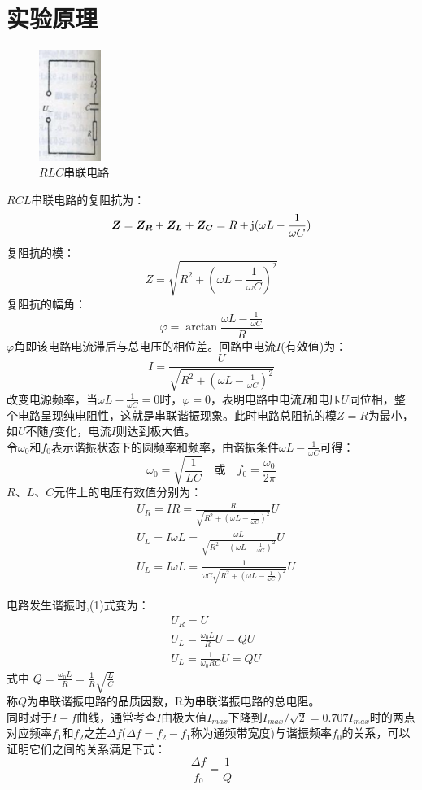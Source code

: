 \documentclass{article}
\begin{document}
\section{实验原理}
\begin{figure}[!h]
    \centering
    \includegraphics[width=2cm]{3.png}
    \caption{$RLC$串联电路}
    \end{figure}
\hspace*{2em}$RCL$串联电路的复阻抗为：
$$
\bm{Z}=\bm{Z_R}+\bm{Z_L}+\bm{Z_C} =R+\textup{j}(\omega L-\frac{1}{\omega C})
$$
复阻抗的模：
$$
Z=\sqrt{R^2+(\omega L-\frac{1}{\omega C})^2}
$$
复阻抗的幅角：
$$
\varphi=\arctan\frac{\omega L-\frac{1}{\omega C}}{R}
$$
$\varphi$角即该电路电流滞后与总电压的相位差。回路中电流$I$(有效值)为：
$$
I=\frac{U}{\sqrt{R^2+(\omega L-\frac{1}{\omega C})^2}}
$$
\hspace*{2em} 改变电源频率，当$\omega L-\frac{1}{\omega C}=0$时，$\varphi=0$，表明电路中电流$I$和电压$U$同位相，整个电路呈现纯电阻性，这就是串联谐振现象。此时电路总阻抗的模$Z=R$为最小，如$U$不随$f$变化，电流$I$则达到极大值。
\\
\hspace*{2em}令$\omega_0$和$f_0$表示谐振状态下的圆频率和频率，由谐振条件$\omega L-\frac{1}{\omega C}$可得：
$$
\omega_0=\sqrt{\frac{1}{LC}}\quad 或 \quad{f_0}=\frac{\omega_0}{2\pi}
$$
$R、L、C$元件上的电压有效值分别为：
\begin{equation}
\begin{aligned}
    &U_R=IR=\frac{R}{\sqrt{R^2+(\omega L-\frac{1}{\omega C})^2}}U \\
    &U_L=I\omega L=\frac{\omega L}{\sqrt{R^2+(\omega L-\frac{1}{\omega C})^2}}U  \\
    &U_L=I\omega L=\frac{1}{\omega C\sqrt{R^2+(\omega L-\frac{1}{\omega C})^2}}U 
\end{aligned}
\end{equation}

\hspace*{2em} 电路发生谐振时,(1)式变为：
\begin{equation}
    \begin{aligned}
        &U_R=U \\
        &U_L=\frac{\omega_0 L}{R}U=QU  \\
        &U_L=\frac{1}{\omega_0RC}U=QU
    \end{aligned}
    \end{equation}
式中\hspace*{2em} $Q=\frac{\omega_0L}{R}=\frac{1}{R}\sqrt{\frac{L}{C}}$\\
称$Q$为串联谐振电路的品质因数，R为串联谐振电路的总电阻。\\
\hspace*{2em}同时对于$I-f$曲线，通常考查$I$由极大值$I_{max}$下降到$I_{max}/\sqrt{2}=0.707I_{max}$时的两点对应频率$f_1$和$f_2$之差$\Delta f$($\Delta f=f_2-f_1$称为通频带宽度)与谐振频率$f_0$的关系，可以证明它们之间的关系满足下式：
$$
\frac{\Delta f}{f_0}=\frac{1}{Q}
$$
\end{document}
